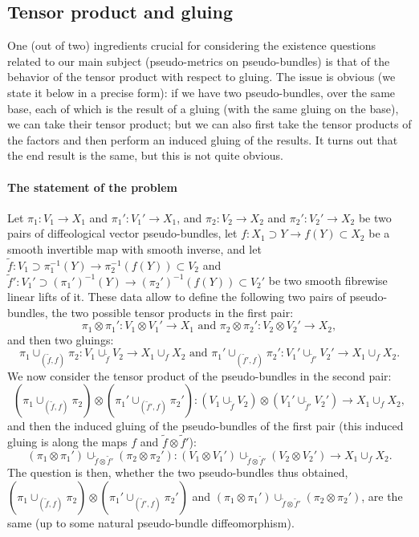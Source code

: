 \documentclass{article}
\begin{document}
\subsection{Tensor product and gluing}

One (out of two) ingredients crucial for considering the existence questions related to our main subject (pseudo-metrics on pseudo-bundles) is that of the behavior of the tensor product with respect to 
gluing. The issue is obvious (we state it below in a precise form): if we have two pseudo-bundles, over the same base, each of which is the result of a gluing (with the same gluing on the base), we can take 
their tensor product; but we can also first take the tensor products of the factors and then perform an induced gluing of the results. It turns out that the end result is the same, but this is not quite obvious.

\paragraph{The statement of the problem} Let $\pi_1:V_1\to X_1$ and $\pi_1':V_1'\to X_1$, and $\pi_2:V_2\to X_2$ and $\pi_2':V_2'\to X_2$ be two pairs of diffeological vector pseudo-bundles, let
$f:X_1\supset Y\to f(Y)\subset X_2$ be a smooth invertible map with smooth inverse, and let $\tilde{f}:V_1\supset\pi_1^{-1}(Y)\to\pi_2^{-1}(f(Y))\subset V_2$ and
$\tilde{f}':V_1'\supset(\pi_1')^{-1}(Y)\to(\pi_2')^{-1}(f(Y))\subset V_2'$ be two smooth fibrewise linear lifts of it. These data allow to define the following two pairs of pseudo-bundles, the two possible tensor 
products in the first pair:
$$\pi_1\otimes\pi_1':V_1\otimes V_1'\to X_1\mbox{ and }\pi_2\otimes\pi_2':V_2\otimes V_2'\to X_2,$$ and then two gluings:
$$\pi_1\cup_{(\tilde{f},f)}\pi_2:V_1\cup_{\tilde{f}}V_2\to X_1\cup_f X_2\mbox{ and }\pi_1'\cup_{(\tilde{f}',f)}\pi_2':V_1'\cup_{\tilde{f}'}V_2'\to X_1\cup_f X_2.$$ We now consider the tensor product of the
pseudo-bundles in the second pair:
$$(\pi_1\cup_{(\tilde{f},f)}\pi_2)\otimes(\pi_1'\cup_{(\tilde{f}',f)}\pi_2'):(V_1\cup_{\tilde{f}}V_2)\otimes(V_1'\cup_{\tilde{f}'}V_2')\to X_1\cup_f X_2,$$ and then the induced gluing of the pseudo-bundles
of the first pair (this induced gluing is along the maps $f$ and $\tilde{f}\otimes\tilde{f}'$):
$$(\pi_1\otimes\pi_1')\cup_{\tilde{f}\otimes\tilde{f}'}(\pi_2\otimes\pi_2'):(V_1\otimes V_1')\cup_{\tilde{f}\otimes\tilde{f}'}(V_2\otimes V_2')\to X_1\cup_f X_2.$$ The question is then, whether the two
pseudo-bundles thus obtained, $(\pi_1\cup_{(\tilde{f},f)}\pi_2)\otimes(\pi_1'\cup_{(\tilde{f}',f)}\pi_2')$ and $(\pi_1\otimes\pi_1')\cup_{\tilde{f}\otimes\tilde{f}'}(\pi_2\otimes\pi_2')$, are the same (up to some 
natural pseudo-bundle diffeomorphism).
\end{document}
